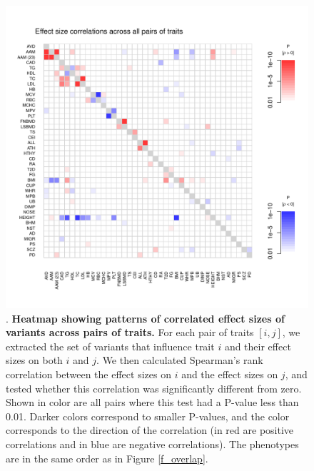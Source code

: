 \documentclass[11pt,titlepage]{article}
\begin{document}
\begin{figure}
\begin{center}
\includegraphics[scale = 0.8]{figs/heatmap_betas.pdf}
\caption{. \textbf{Heatmap showing patterns of correlated effect sizes of variants across pairs of traits.} For each pair of traits $[i,j]$, we extracted the set of variants that influence trait $i$ and their effect sizes on both $i$ and $j$. We then calculated Spearman's rank correlation between the effect sizes on $i$ and the effect sizes on $j$, and tested whether this correlation was significantly different from zero. Shown in color are all pairs where this test had a P-value less than 0.01. Darker colors correspond to smaller P-values, and the color corresponds to the direction of the correlation (in red are positive correlations and in blue are negative correlations). The phenotypes are in the same order as in Figure \ref{f_overlap}. }\label{f_corr}
\end{center}
\end{figure}
\end{document}
